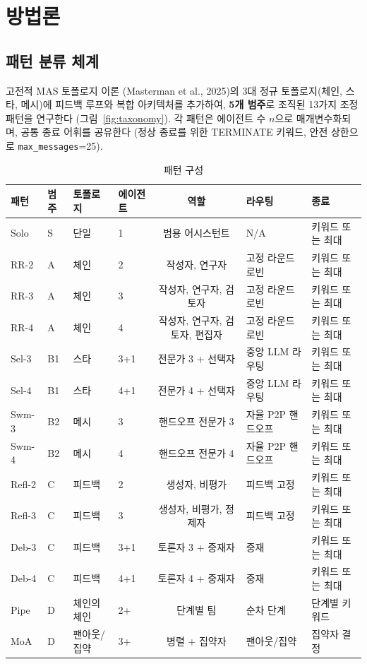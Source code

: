 \documentclass[a4paper,11pt]{article}
\begin{document}
\section{방법론}

\subsection{패턴 분류 체계}

고전적 MAS 토폴로지 이론 (Masterman et al., 2025)의 3대 정규 토폴로지(체인, 스타, 메시)에 피드백 루프와 복합 아키텍처를 추가하여, \textbf{5개 범주}로 조직된 13가지 조정 패턴을 연구한다 (그림~\ref{fig:taxonomy}). 각 패턴은 에이전트 수 $n$으로 매개변수화되며, 공통 종료 어휘를 공유한다 (정상 종료를 위한 TERMINATE 키워드, 안전 상한으로 \texttt{max\_messages}=25).

\begin{table}[H]
\centering
\caption{패턴 구성}
\label{tab:patterns}
{\small
\begin{tabular}{llllcll}
\toprule
\textbf{패턴} & \textbf{범주} & \textbf{토폴로지} & \textbf{에이전트} & \textbf{역할} & \textbf{라우팅} & \textbf{종료} \\
\midrule
Solo & S & 단일 & 1 & 범용 어시스턴트 & N/A & 키워드 또는 최대 \\
RR-2 & A & 체인 & 2 & 작성자, 연구자 & 고정 라운드 로빈 & 키워드 또는 최대 \\
RR-3 & A & 체인 & 3 & 작성자, 연구자, 검토자 & 고정 라운드 로빈 & 키워드 또는 최대 \\
RR-4 & A & 체인 & 4 & 작성자, 연구자, 검토자, 편집자 & 고정 라운드 로빈 & 키워드 또는 최대 \\
Sel-3 & B1 & 스타 & 3+1 & 전문가 3 + 선택자 & 중앙 LLM 라우팅 & 키워드 또는 최대 \\
Sel-4 & B1 & 스타 & 4+1 & 전문가 4 + 선택자 & 중앙 LLM 라우팅 & 키워드 또는 최대 \\
Swm-3 & B2 & 메시 & 3 & 핸드오프 전문가 3 & 자율 P2P 핸드오프 & 키워드 또는 최대 \\
Swm-4 & B2 & 메시 & 4 & 핸드오프 전문가 4 & 자율 P2P 핸드오프 & 키워드 또는 최대 \\
Refl-2 & C & 피드백 & 2 & 생성자, 비평가 & 피드백 고정 & 키워드 또는 최대 \\
Refl-3 & C & 피드백 & 3 & 생성자, 비평가, 정제자 & 피드백 고정 & 키워드 또는 최대 \\
Deb-3 & C & 피드백 & 3+1 & 토론자 3 + 중재자 & 중재 & 키워드 또는 최대 \\
Deb-4 & C & 피드백 & 4+1 & 토론자 4 + 중재자 & 중재 & 키워드 또는 최대 \\
Pipe & D & 체인의 체인 & 2+ & 단계별 팀 & 순차 단계 & 단계별 키워드 \\
MoA & D & 팬아웃/집약 & 3+ & 병렬 + 집약자 & 팬아웃/집약 & 집약자 결정 \\
\bottomrule
\end{tabular}
}
\end{table}
\end{document}
